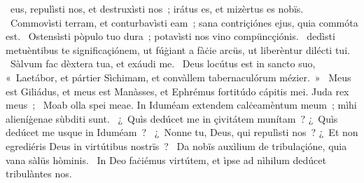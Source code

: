 {  }
{%
~eus, repulìsti nos, et destruxìsti nos~; irátus es, et mizèrtus es nobïs. 
~Commovìsti terram, et conturbavìsti eam~; sana contriçiónes ejus, quia commóta est. 
~Ostensìsti pòpulo tuo dura~; potavìsti nos vino compüncçiónis. 
~dedìsti metuèntibus te significaçiónem, ut fúġiant a fàċie arcüs, ut liberèntur dilécti tui. 
~Sàlvum fac dèxtera tua, et exáudi me. 
~Deus locútus est in sancto suo, «~Laetábor, et pártier Sìchimam, et convàllem tabernaculórum mézier.~»
~Meus est Giliádus, et meus est Manàsses, et Ephrémus fortitúdo cápitis mei. Juda rex meus~; 
~Moab olla spei meae. In Iduméam extendem calċeamèntum meum~; mìhi alieníġenae sùbditi sunt. 
~¿~Quìs dedúcet me in çivitátem munítam~? ¿~Quìs dedúcet me usque in Iduméam~? 
~¿~Nonne tu, Deus, qui repulìsti nos~? ¿~Et non egrediéris Deus in virtútibus nostrïs~? 
~Da nobïs auxìlium de tribulaçióne, quia vana sàlüs hòminis. 
~In Deo faċiémus virtútem, et ìpse ad nìhilum dedúcet tribulàntes nos. 
}
